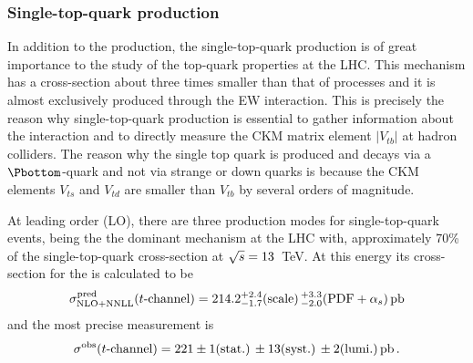 \subsubsection{Single-top-quark production}
\label{sec:Chap1:Top:Production:SingleTop}
In addition to the \ttbar production, the single-top-quark production is of great 
importance to the study of the top-quark properties at the LHC.  
This mechanism has a cross-section about three times smaller than that of \ttbar processes and  
it is almost exclusively produced through the EW interaction.
This is precisely the reason why single-top-quark production is essential to gather 
information about the \Wtb interaction and to directly measure the CKM
matrix element $|V_{tb}|$ at hadron colliders.
The reason why the single top quark is produced and decays via a $\Pbottom$-quark
and not via strange 
or down quarks is because the CKM elements $V_{ts}$ and $V_{td}$ 
are smaller than $V_{tb}$  by several orders of magnitude. 

At leading order (LO), there are three production modes for 
single-top-quark events, being the \tchannel the dominant mechanism at the LHC 
with, approximately 70\% of  the single-top-quark cross-section at $\sqrt{s}=13$~TeV.  %
At this energy its cross-section for the \tchannel is calculated to be~\cite{Campbell:2020fhf}
\begin{equation*}
\sigma^{\text{pred}}_{\text{NLO+NNLL}} (t\text{-channel}) = 214.2^{+2.4}_{-1.7}\text{(scale)}\,^{+3.3}_{-2.0}(\text{PDF}+\alpha_{s})\,\textrm{pb}
\end{equation*} 
and the most precise measurement is~\cite{ATLAS:2023hul}
\begin{equation*}
\sigma^{\text{obs}} (t\text{-channel})= 221  \pm 1 \text{(stat.)}\, \pm 13\text{(syst.)} \, \pm 2 \text{(lumi.)} \,\textrm{pb}\, .
\end{equation*} 

